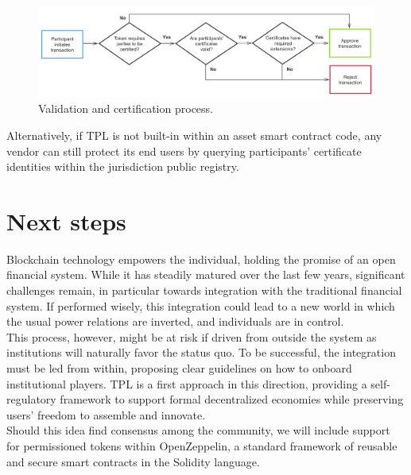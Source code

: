 \documentclass[10pt]{article}
\begin{document}
\begin{figure}[ht]
    \centering
    \includegraphics[width=0.8\linewidth]{figures/figure4.png}
    \caption{Validation and certification process.}
    \label{fig:fig4}
\end{figure}

\noindent Alternatively, if TPL is not built-in within an asset smart contract code, any vendor can still protect its end users by querying participants’ certificate identities within the jurisdiction public registry.\\

\section{Next steps}
Blockchain technology empowers the individual, holding the promise of an open financial system. While it has steadily matured over the last few years, significant challenges remain, in particular towards integration with the traditional financial system. If performed wisely, this integration could lead to a new world in which the usual power relations are inverted, and individuals are in control.\\

\noindent This process, however, might be at risk if driven from outside the system as institutions will naturally favor the status quo. To be successful, the integration must be led from within, proposing clear guidelines on how to onboard institutional players. TPL is a first approach in this direction, providing a self-regulatory framework to support formal decentralized economies while preserving users’ freedom to assemble and innovate.\\
 
\noindent Should this idea find consensus among the community, we will include support for permissioned tokens within OpenZeppelin\cite{openzeppelin}, a standard framework of reusable and secure smart contracts in the Solidity language. \\

{}

   
\end{document}
